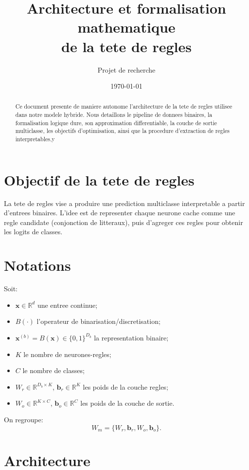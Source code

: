 \documentclass[11pt,a4paper]{article}
\title{Architecture et formalisation mathematique\\de la tete de regles}
\author{Projet de recherche}
\date{\today}
\begin{document}
\maketitle

\begin{abstract}
Ce document presente de maniere autonome l'architecture de la tete de regles
utilisee dans notre modele hybride. Nous detaillons le pipeline de donnees binaires,
la formalisation logique dure, son approximation differentiable, la couche de sortie
multiclasse, les objectifs d'optimisation, ainsi que la procedure d'extraction de regles
interpretables.y
\end{abstract}

\section{Objectif de la tete de regles}
La tete de regles vise a produire une prediction multiclasse interpretable a partir d'entrees binaires.
L'idee est de representer chaque neurone cache comme une regle candidate (conjonction de litteraux),
puis d'agreger ces regles pour obtenir les logits de classes.

\section{Notations}
Soit:
\begin{itemize}
    \item $\bm{x}\in\mathbb{R}^{d}$ une entree continue;
    \item $B(\cdot)$ l'operateur de binarisation/discretisation;
    \item $\bm{x}^{(b)}=B(\bm{x})\in\{0,1\}^{D_b}$ la representation binaire;
    \item $K$ le nombre de neurones-regles;
    \item $C$ le nombre de classes;
    \item $W_r\in\mathbb{R}^{D_b\times K}$, $\bm{b}_r\in\mathbb{R}^{K}$ les poids de la couche regles;
    \item $W_o\in\mathbb{R}^{K\times C}$, $\bm{b}_o\in\mathbb{R}^{C}$ les poids de la couche de sortie.
\end{itemize}

On regroupe:
\[
W_m=\{W_r,\bm{b}_r,W_o,\bm{b}_o\}.
\]

\section{Architecture}
\end{document}
